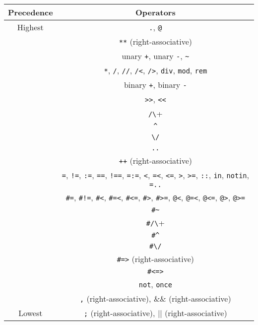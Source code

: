 \begin{center}
\begin{tabular}{ |c|c| } \hline
Precedence & Operators  \\ \hline \hline
Highest    & \verb+.+, \verb+@+ \\ \hline
           & \verb+**+ (right-associative) \\ \hline
           & unary \verb-+-, unary \verb+-+, \verb+~+  \\ \hline 
           & \verb+*+, \verb+/+, \verb+//+, \verb+/<+, \verb+/>+, \verb+div+, \verb+mod+, \verb+rem+ \\ \hline 
           & binary \verb-+-, binary \verb+-+ \\ \hline 
           & \verb+>>+, \verb+<<+ \\ \hline 
           & \verb+/\+ \\ \hline 
           & \verb+^+ \\ \hline 
           & \verb+\/+ \\ \hline 
           & \verb+..+ \\ \hline 
           & \verb-++- (right-associative) \\ \hline 
           & \verb+=+, \verb+!=+,  \verb+:=+,  \verb+==+, \verb+!==+, \verb+=:=+, \verb+<+,  \verb+=<+, \verb+<=+, \verb+>+,  \verb+>=+, \verb+::+, \verb+in+, \verb+notin+, \verb+=..+  \\ 
           &  \verb+#=+,  \verb+#!=+, \verb+#<+,  \verb+#=<+, \verb+#<=+, \verb+#>+, \verb+#>=+, \verb+@<+, \verb+@=<+, \verb+@<=+, \verb+@>+, \verb+@>=+  \\ \hline 
           & \verb+#~+ \\ \hline 
           & \verb+#/\+ \\ \hline 
           & \verb+#^+ \\ \hline 
           & \verb+#\/+ \\ \hline 
           & \verb+#=>+ (right-associative)\\ \hline 
           & \verb+#<=>+ \\ \hline 
           & \verb+not+, \verb+once+  \\ \hline 
           & \verb+,+ (right-associative), $\&\&$ (right-associative) \\ \hline 
Lowest     & \verb+;+ (right-associative), $|$$|$ (right-associative) \\ \hline
\end{tabular}
\end{center}

